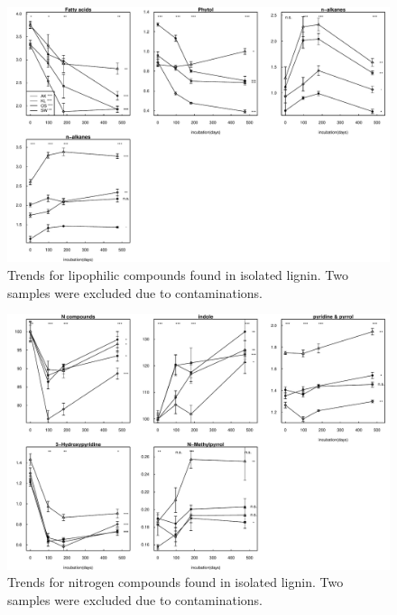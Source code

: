 \documentclass[preprint,review,12pt]{elsarticle}
\begin{document}
\newpage
\begin{figure}[h!]
\vspace*{2mm}
\begin{center}

\includegraphics{pyrpaper-notlignin}
\end{center}
\caption{Trends for lipophilic compounds found in isolated lignin. Two samples were excluded due to contaminations.}
\label{fig:notlig}
\end{figure}

\newpage
\begin{figure}[h!]
\vspace*{2mm}
\begin{center}

\includegraphics{pyrpaper-ncomp}
\end{center}
\caption{Trends for nitrogen compounds found in isolated lignin. Two samples were excluded due to contaminations.}
\label{fig:npeaks}
\end{figure}
\end{document}
